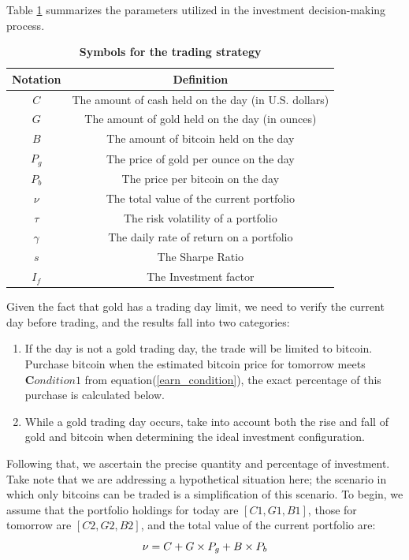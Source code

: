 \documentclass{mcmthesis}
\begin{document}
Table \ref{Nota_invest} summarizes the parameters utilized in the investment decision-making process.
\begin{table}[H]
	\caption{\textbf{Symbols for the trading strategy}}%
	\label{Nota_invest}
	\centering%
	\begin{tabular}{cc}%
		\toprule%
		Notation&Definition \\
		\midrule%
		$C$&The amount of cash held on the day (in U.S. dollars)\\
		$G$&The amount of gold held on the day (in ounces)\\
		$B$&The amount of bitcoin held on the day \\
		$P_{g}$&The price of gold per ounce on the day\\
		$P_{b}$&The price per bitcoin on the day\\
	    $\nu$&The total value of the current portfolio \\
		$\tau$&The risk volatility of a portfolio \\
		$\gamma$&The daily rate of return on a portfolio\\
		$s$&The Sharpe Ratio\\
		$I_{f}$&The Investment factor\\
		\bottomrule%
	\end{tabular}
\end{table}
Given the fact that gold has a trading day limit, we need to verify the current day before trading, and the results fall into two categories:
\begin{enumerate}[fullwidth,itemindent=2em,label=\roman*.]
	\item If the day is not a gold trading day, the trade will be limited to bitcoin.
			Purchase bitcoin when the estimated bitcoin price for tomorrow meets $\boldsymbol Condition 1$ from equation(\ref{earn_condition}), the exact percentage of this purchase is calculated below.
	\item While a gold trading day occurs, take into account both the rise and fall of gold and bitcoin when determining the ideal investment configuration.
\end{enumerate}

Following that, we ascertain the precise quantity and percentage of investment. Take note that we are addressing a hypothetical situation here; the scenario in which only bitcoins can be traded is a simplification of this scenario. To begin, we assume that the portfolio holdings for today are $[C1,G1,B1]$, those for tomorrow are $[C2,G2,B2]$, and the total value of the current portfolio are:
\begin{equation}
	\nu= C + G \times  P_{g} + B \times P_{b} \\
\end{equation}
\end{document}
